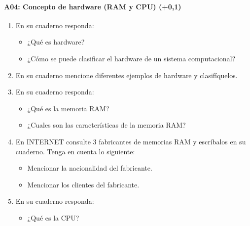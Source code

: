 \documentclass[letterpaper,10pt,spanish]{sphinxmanual}
\begin{document}
\paragraph{A04: Concepto de hardware (RAM y CPU) (+0,1)}
\label{\detokenize{cursos/ofimatica11/periodo01/G01:a04-concepto-de-hardware-ram-y-cpu-0-1}}
\sphinxAtStartPar
{}
\begin{enumerate}
%
\item {} 
\sphinxAtStartPar
En su cuaderno responda:
\begin{itemize}
\item {} 
\sphinxAtStartPar
¿Qué es hardware?

\item {} 
\sphinxAtStartPar
¿Cómo se puede clasificar el hardware de un sistema computacional?

\end{itemize}

\item {} 
\sphinxAtStartPar
En su cuaderno mencione diferentes ejemplos de hardware y clasifíquelos.

\item {} 
\sphinxAtStartPar
En su cuaderno responda:
\begin{itemize}
\item {} 
\sphinxAtStartPar
¿Qué es la memoria RAM?

\item {} 
\sphinxAtStartPar
¿Cuales son las características de la memoria RAM?

\end{itemize}

\item {} 
\sphinxAtStartPar
En INTERNET consulte 3 fabricantes de memorias RAM y escríbalos en su cuaderno. Tenga en cuenta lo siguiente:
\begin{itemize}
\item {} 
\sphinxAtStartPar
Mencionar la nacionalidad del fabricante.

\item {} 
\sphinxAtStartPar
Mencionar los clientes del fabricante.

\end{itemize}

\item {} 
\sphinxAtStartPar
En su cuaderno responda:
\begin{itemize}
\item {} 
\sphinxAtStartPar
¿Qué es la CPU?


\end{itemize}
\end{enumerate}
\end{document}
